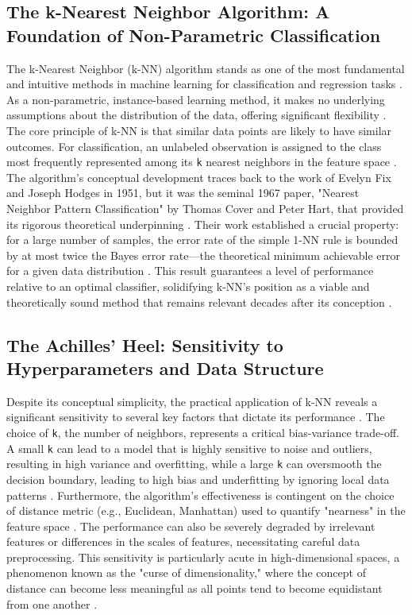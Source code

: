 \documentclass[conference]{IEEEtran}
\begin{document}
\subsection{The k-Nearest Neighbor Algorithm: A Foundation of Non-Parametric Classification}
The k-Nearest Neighbor (k-NN) algorithm stands as one of the most fundamental and intuitive methods in machine learning for classification and regression tasks \cite{b1, b2}. As a non-parametric, instance-based learning method, it makes no underlying assumptions about the distribution of the data, offering significant flexibility \cite{b1, b2}. The core principle of k-NN is that similar data points are likely to have similar outcomes. For classification, an unlabeled observation is assigned to the class most frequently represented among its \texttt{k} nearest neighbors in the feature space \cite{b3, b4}. The algorithm's conceptual development traces back to the work of Evelyn Fix and Joseph Hodges in 1951, but it was the seminal 1967 paper, "Nearest Neighbor Pattern Classification" by Thomas Cover and Peter Hart, that provided its rigorous theoretical underpinning \cite{b5, b6}. Their work established a crucial property: for a large number of samples, the error rate of the simple 1-NN rule is bounded by at most twice the Bayes error rate—the theoretical minimum achievable error for a given data distribution \cite{b5, b7}. This result guarantees a level of performance relative to an optimal classifier, solidifying k-NN's position as a viable and theoretically sound method that remains relevant decades after its conception \cite{b8, b9, b10}.

\subsection{The Achilles' Heel: Sensitivity to Hyperparameters and Data Structure}
Despite its conceptual simplicity, the practical application of k-NN reveals a significant sensitivity to several key factors that dictate its performance \cite{b3, b11}. The choice of \texttt{k}, the number of neighbors, represents a critical bias-variance trade-off. A small \texttt{k} can lead to a model that is highly sensitive to noise and outliers, resulting in high variance and overfitting, while a large \texttt{k} can oversmooth the decision boundary, leading to high bias and underfitting by ignoring local data patterns \cite{b3, b12}. Furthermore, the algorithm's effectiveness is contingent on the choice of distance metric (e.g., Euclidean, Manhattan) used to quantify "nearness" in the feature space \cite{b1, b4}. The performance can also be severely degraded by irrelevant features or differences in the scales of features, necessitating careful data preprocessing. This sensitivity is particularly acute in high-dimensional spaces, a phenomenon known as the "curse of dimensionality," where the concept of distance can become less meaningful as all points tend to become equidistant from one another \cite{b4, b11}.
\end{document}
